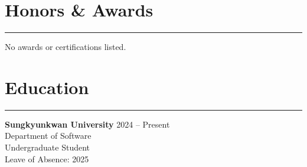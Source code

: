 \documentclass[letterpaper,10pt]{article}
\begin{document}
\section*{Honors \& Awards}
\hrule
\vspace{4pt}
No awards or certifications listed.

\section*{Education}
\hrule
\vspace{4pt}
\textbf{Sungkyunkwan University}
\hfill 2024 -- Present \\
Department of Software \\
Undergraduate Student \\
Leave of Absence: 2025
\end{document}
